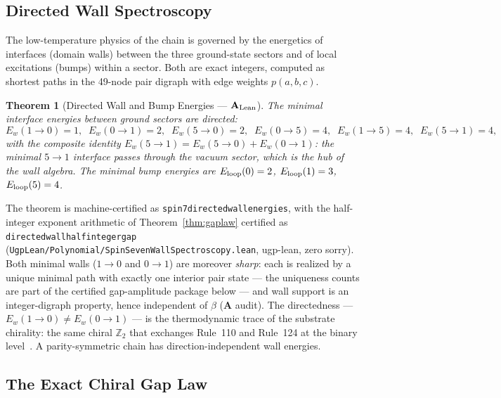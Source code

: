\documentclass[11pt]{article}
\newtheorem{theorem}{Theorem}[section]
\theoremstyle{remark}
\newcommand{\lean}[1]{%
  \penalty-100
  \begingroup\def\_{\textunderscore\allowbreak}\texttt{#1}\endgroup}
\newcommand{\CatA}{\textbf{A}}
\newcommand{\CatAL}{\ensuremath{\textbf{A}_{\rm Lean}}}
\begin{document}
\subsection{Directed Wall Spectroscopy}
\label{sec:walls}

The low-temperature physics of the chain is governed by the energetics of
interfaces (domain walls) between the three ground-state sectors and of local
excitations (bumps) within a sector. Both are exact integers, computed as
shortest paths in the 49-node pair digraph with edge weights
$p(a,b,c)$.

\begin{theorem}[Directed Wall and Bump Energies --- \CatAL{}]
\label{thm:walls}
The minimal interface energies between ground sectors are directed:
\[
  E_w(1{\to}0) = 1, \;\; E_w(0{\to}1) = 2, \;\;
  E_w(5{\to}0) = 2, \;\; E_w(0{\to}5) = 4, \;\;
  E_w(1{\to}5) = 4, \;\; E_w(5{\to}1) = 4,
\]
with the composite identity $E_w(5{\to}1) = E_w(5{\to}0) + E_w(0{\to}1)$: the
minimal $5{\to}1$ interface passes through the vacuum sector, which is the hub
of the wall algebra. The minimal bump energies are $E_{\rm loop}(0) = 2$,
$E_{\rm loop}(1) = 3$, $E_{\rm loop}(5) = 4$.
\end{theorem}

The theorem is machine-certified as \lean{spin7\_directed\_wall\_energies},
with the half-integer exponent arithmetic of
Theorem~\ref{thm:gaplaw} certified as
\lean{directed\_wall\_half\_integer\_gap}
(\texttt{UgpLean/Polynomial/SpinSevenWallSpectroscopy.lean}, ugp-lean, zero
sorry). Both minimal walls ($1{\to}0$ and $0{\to}1$) are moreover
\emph{sharp}: each is realized by a unique minimal path with exactly one
interior pair state --- the uniqueness counts are part of the certified
gap-amplitude package below --- and wall support is an integer-digraph
property, hence independent of $\beta$ (\CatA{} audit). The
directedness --- $E_w(1{\to}0) \neq E_w(0{\to}1)$ --- is the
thermodynamic trace of the substrate chirality: the same chiral $\mathbb{Z}_2$
that exchanges Rule~110 and Rule~124 at the binary
level~\cite{SpivackGTEPolynomialWolfram}. A parity-symmetric chain has
direction-independent wall energies.

\subsection{The Exact Chiral Gap Law}
\label{sec:gaplaw}
\end{document}
